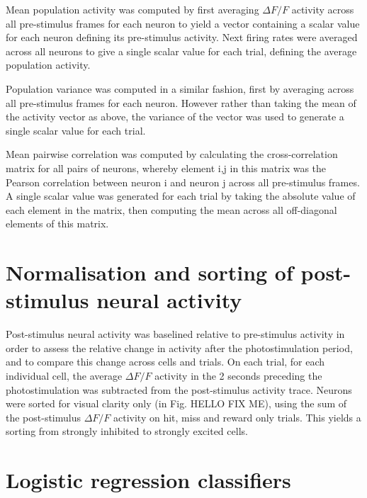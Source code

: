 Mean population activity was computed by first averaging $\Delta F/F$ activity across all pre-stimulus frames for each neuron to yield a vector containing a scalar value for each neuron defining its pre-stimulus activity. Next firing rates were averaged across all neurons to give a single scalar value for each trial, defining the average population activity. 

Population variance was computed in a similar fashion, first by averaging across all pre-stimulus frames for each neuron. However rather than taking the mean of the activity vector as above, the variance of the vector was used to generate a single scalar value for each trial.

Mean pairwise correlation was computed by calculating the cross-correlation matrix for all pairs of neurons, whereby element i,j in this matrix was the Pearson correlation between neuron i and neuron j across all pre-stimulus frames. A single scalar value was generated for each trial by taking the absolute value of each element in the matrix, then computing the mean across all off-diagonal elements of this matrix.


\section{Normalisation and sorting of post-stimulus neural activity}

Post-stimulus neural activity was baselined relative to pre-stimulus activity in order to assess the relative change in activity after the photostimulation period, and to compare this change across cells and trials. On each trial, for each individual cell, the average $\Delta F/F$ activity in the 2 seconds preceding the photostimulation was subtracted from the post-stimulus activity trace. Neurons were sorted for visual clarity only (in Fig. HELLO FIX ME), using the sum of the post-stimulus $\Delta F/F$ activity on hit, miss and reward only trials. This yields a sorting from strongly inhibited to strongly excited cells. 


\section{Logistic regression classifiers}

